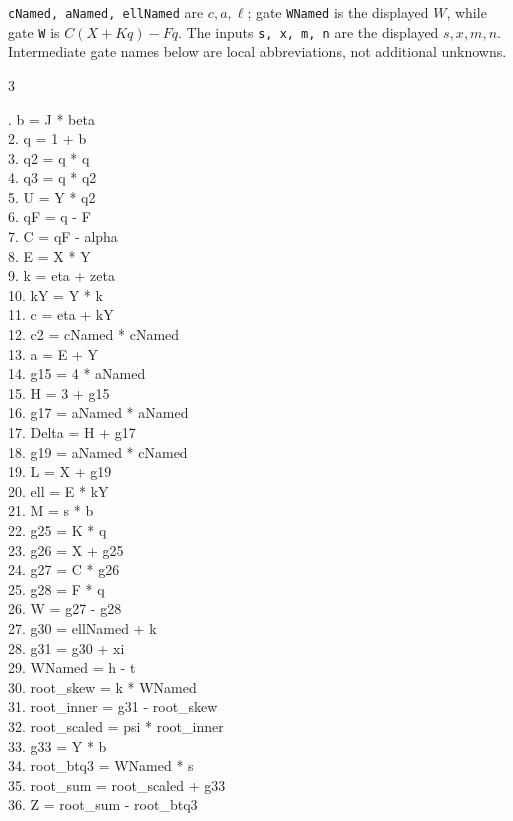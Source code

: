 \documentclass[10pt]{article}
\begin{document}
\texttt{cNamed, aNamed, ellNamed} are $c,a,\ell$; gate \texttt{WNamed} is the
displayed $W$, while gate \texttt{W} is $C(X+Kq)-Fq$. The inputs
\texttt{s, x, m, n} are the displayed $s,x,m,n$. Intermediate gate
names below are local abbreviations, not additional unknowns.
\begin{multicols}{3}
\raggedright\ttfamily\fontsize{7.2}{8.4}. b = J * beta\\
2. q = 1 + b\\
3. q2 = q * q\\
4. q3 = q * q2\\
5. U = Y * q2\\
6. qF = q - F\\
7. C = qF - alpha\\
8. E = X * Y\\
9. k = eta + zeta\\
10. kY = Y * k\\
11. c = eta + kY\\
12. c2 = cNamed * cNamed\\
13. a = E + Y\\
14. g15 = 4 * aNamed\\
15. H = 3 + g15\\
16. g17 = aNamed * aNamed\\
17. Delta = H + g17\\
18. g19 = aNamed * cNamed\\
19. L = X + g19\\
20. ell = E * kY\\
21. M = s * b\\
22. g25 = K * q\\
23. g26 = X + g25\\
24. g27 = C * g26\\
25. g28 = F * q\\
26. W = g27 - g28\\
27. g30 = ellNamed + k\\
28. g31 = g30 + xi\\
29. WNamed = h - t\\
30. root\_skew = k * WNamed\\
31. root\_inner = g31 - root\_skew\\
32. root\_scaled = psi * root\_inner\\
33. g33 = Y * b\\
34. root\_btq3 = WNamed * s\\
35. root\_sum = root\_scaled + g33\\
36. Z = root\_sum - root\_btq3\\

\end{multicols}
\end{document}
